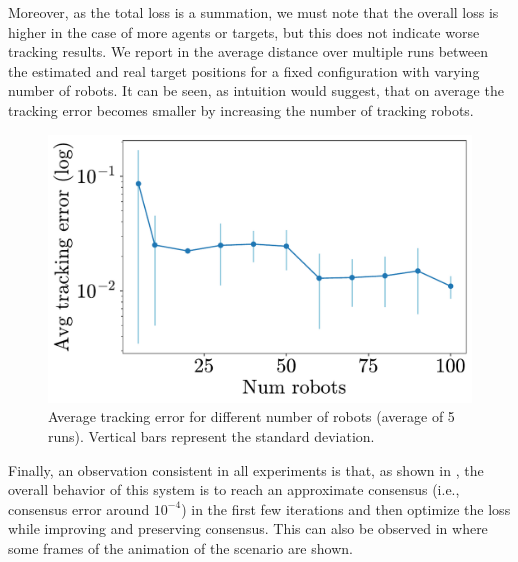 \documentclass[a4paper,11pt,oneside]{book}
\begin{document}
Moreover, as the total loss is a summation, we must note that the overall loss is higher in the case of more agents or targets, but this does not indicate worse tracking results. We report in  the average distance over multiple runs between the estimated and real target positions for a fixed configuration with varying number of robots. It can be seen, as intuition would suggest, that on average the tracking error becomes smaller by increasing the number of tracking robots.

\begin{figure}[H]
      \centering
      \includegraphics[width=0.46\linewidth]{./figs/tracking/average/avg_tracking.pdf}
      \caption{Average tracking error for different number of robots (average of 5 runs). Vertical bars represent the standard deviation.}
      \label{fig:tracking_avg_error_runs}
\end{figure}


Finally, an observation consistent in all experiments is that, as shown in , the overall behavior of this system is to reach an approximate consensus (i.e., consensus error around $10^{-4}$) in the first few iterations and then optimize the loss while improving and preserving consensus. This can also be observed in  where some frames of the animation of the scenario are shown.
\end{document}
